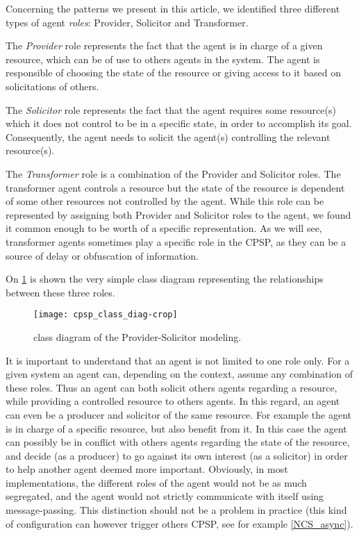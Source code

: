 Concerning the patterns we present in this article, we identified three different types of agent \emph{roles}: Provider, Solicitor and Transformer.

The \emph{Provider} role represents the fact that the agent is in charge of a given resource, which can be of use to others agents in the system. The agent is responsible of choosing the state of the resource or giving access to it based on solicitations of others.

The \emph{Solicitor} role represents the fact that the agent requires some resource(s) which it does not control to be in a specific state, in order to accomplish its goal. Consequently, the agent needs to solicit the agent(s) controlling the relevant resource(s).

The \emph{Transformer} role is a combination of the Provider and Solicitor roles. The transformer agent controls a resource but the state of the resource is dependent of some other resources not controlled by the agent. While this role can be represented by assigning both Provider and Solicitor roles to the agent, we found it common enough to be worth of a specific representation. As we will see, transformer agents sometimes play a specific role in the CPSP, as they can be a source of delay or obfuscation of information.

On \figurename{} \ref{cpsp_class_diag} is shown the very simple class diagram representing the relationships between these three roles.

\begin{figure}
\centering
\texttt{[image: cpsp\_class\_diag-crop]}
\caption{class diagram of the Provider-Solicitor modeling.}
\label{cpsp_class_diag}
\end{figure}

It is important to understand that an agent is not limited to one role only. For a given system an agent can, depending on the context, assume any combination of these roles. Thus an agent can both solicit others agents regarding a resource, while providing a controlled resource to others agents.
In this regard, an agent can even be a producer and solicitor of the same resource. For example the agent is in charge of a specific resource, but also benefit from it. In this case the agent can possibly be in conflict with others agents regarding the state of the resource, and decide (as a producer) to go against its own interest (as a solicitor) in order to help another agent deemed more important.
Obviously, in most implementations, the different roles of the agent would not be as much segregated, and the agent would not strictly communicate with itself using message-passing. This distinction should not be a problem in practice (this kind of configuration can however trigger others CPSP, see for example \ref{NCS_async}).

